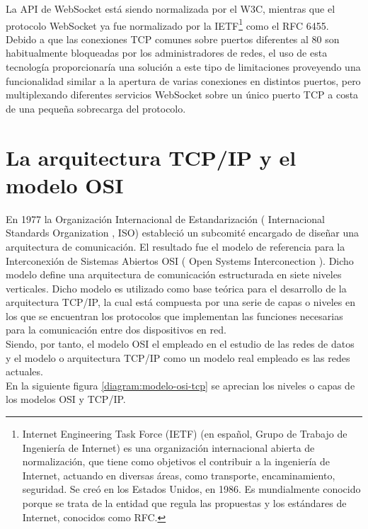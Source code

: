 La API de WebSocket está siendo normalizada por el W3C, mientras que el protocolo WebSocket ya fue normalizado por la IETF\footnote{Internet Engineering Task Force (IETF) (en español, Grupo de Trabajo de Ingeniería de Internet)
es una organización internacional abierta de normalización, que tiene como objetivos el contribuir a la ingeniería de Internet, actuando en diversas áreas, como transporte, encaminamiento, seguridad.
Se creó en los Estados Unidos, en 1986. Es mundialmente conocido porque se trata de la entidad que regula las propuestas y los estándares de Internet, conocidos como RFC.} como el RFC 6455.\\

Debido a que las conexiones TCP comunes sobre puertos diferentes al 80 son habitualmente bloqueadas por los administradores de redes, el uso de esta tecnología proporcionaría una solución
a este tipo de limitaciones proveyendo una funcionalidad similar a la apertura de varias conexiones en distintos puertos, pero multiplexando diferentes servicios WebSocket sobre un único
puerto TCP a costa de una pequeña sobrecarga del protocolo.



\section{La arquitectura TCP/IP y el modelo OSI}
\label{sec:modelo-osi}

En 1977 la Organización Internacional de Estandarización ( Internacional Standards Organization , ISO) estableció un subcomité encargado de diseñar una arquitectura de
comunicación. El resultado fue el modelo de referencia para la Interconexión de Sistemas Abiertos OSI ( Open Systems Interconection ). Dicho modelo define una arquitectura de
comunicación estructurada en siete niveles verticales. Dicho modelo es utilizado como base teórica para el desarrollo de la arquitectura TCP/IP, la cual está compuesta por una serie de capas
o niveles en los que se encuentran los protocolos que implementan las funciones necesarias para la comunicación entre dos dispositivos en red.\\

Siendo, por tanto, el modelo OSI el empleado en el estudio de las redes de datos y el modelo o arquitectura TCP/IP como un modelo real
empleado es las redes actuales.\\

En la siguiente figura \ref{diagram:modelo-osi-tcp} se aprecian los niveles o capas de los modelos OSI y TCP/IP.\\

